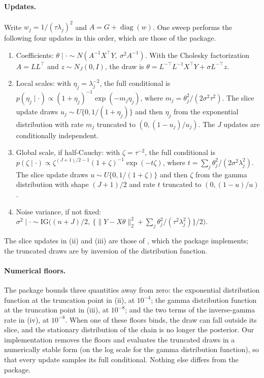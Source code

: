 \paragraph*{Updates.} Write $w_j=1/(\tau\lambda_j)^2$ and $A=G+\operatorname{diag}(w)$. One sweep performs the following four updates in this order, which are those of the package.
\begin{enumerate}[label=(\roman*)]
\item Coefficients: $\theta\mid\cdot\sim N(A^{-1}X^\top Y,\ \sigma^2A^{-1})$. With the Cholesky factorization $A=LL^\top$ and $z\sim N_J(0,I)$, the draw is $\theta=L^{-\top}L^{-1}X^\top Y+\sigma L^{-\top}z$.
\item Local scales: with $\eta_j=\lambda_j^{-2}$, the full conditional is $p(\eta_j\mid\cdot)\propto(1+\eta_j)^{-1}\exp(-m_j\eta_j)$, where $m_j=\theta_j^2/(2\sigma^2\tau^2)$. The slice update draws $u_j\sim U\{0,1/(1+\eta_j)\}$ and then $\eta_j$ from the exponential distribution with rate $m_j$ truncated to $(0,(1-u_j)/u_j)$. The $J$ updates are conditionally independent.
\item Global scale, if half-Cauchy: with $\zeta=\tau^{-2}$, the full conditional is $p(\zeta\mid\cdot)\propto\zeta^{(J+1)/2-1}(1+\zeta)^{-1}\exp(-t\zeta)$, where $t=\sum_j\theta_j^2/(2\sigma^2\lambda_j^2)$. The slice update draws $u\sim U\{0,1/(1+\zeta)\}$ and then $\zeta$ from the gamma distribution with shape $(J+1)/2$ and rate $t$ truncated to $(0,(1-u)/u)$.
\item Noise variance, if not fixed: $\sigma^2\mid\cdot\sim\mathrm{IG}\bigl((n+J)/2,\ \{\|Y-X\theta\|_2^2+\sum_j\theta_j^2/(\tau^2\lambda_j^2)\}/2\bigr)$.
\end{enumerate}
The slice updates in (ii) and (iii) are those of \citet{PolsonScottWindle2014}, which the package implements; the truncated draws are by inversion of the distribution function.

\paragraph*{Numerical floors.} The package bounds three quantities away from zero: the exponential distribution function at the truncation point in (ii), at $10^{-4}$; the gamma distribution function at the truncation point in (iii), at $10^{-8}$; and the two terms of the inverse-gamma rate in (iv), at $10^{-8}$. When one of these floors binds, the draw can fall outside its slice, and the stationary distribution of the chain is no longer the posterior. Our implementation removes the floors and evaluates the truncated draws in a numerically stable form (on the log scale for the gamma distribution function), so that every update samples its full conditional. Nothing else differs from the package.


